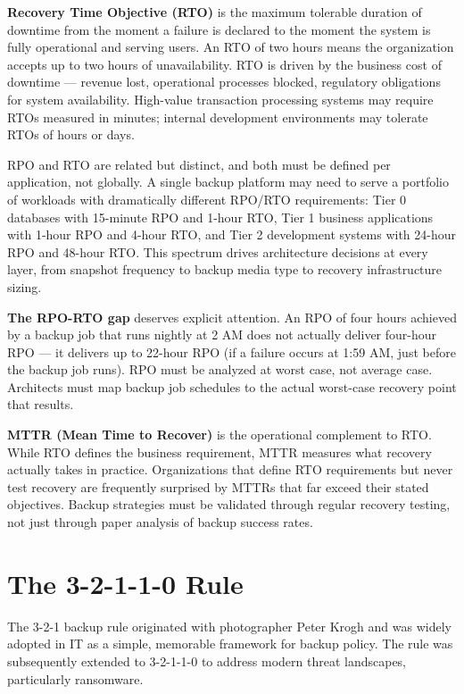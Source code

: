 \textbf{Recovery Time Objective (RTO)} is the maximum tolerable duration of downtime from the moment a failure is declared to the moment the system is fully operational and serving users. An RTO of two hours means the organization accepts up to two hours of unavailability. RTO is driven by the business cost of downtime --- revenue lost, operational processes blocked, regulatory obligations for system availability. High-value transaction processing systems may require RTOs measured in minutes; internal development environments may tolerate RTOs of hours or days.

RPO and RTO are related but distinct, and both must be defined per application, not globally. A single backup platform may need to serve a portfolio of workloads with dramatically different RPO/RTO requirements: Tier 0 databases with 15-minute RPO and 1-hour RTO, Tier 1 business applications with 1-hour RPO and 4-hour RTO, and Tier 2 development systems with 24-hour RPO and 48-hour RTO. This spectrum drives architecture decisions at every layer, from snapshot frequency to backup media type to recovery infrastructure sizing.

\textbf{The RPO-RTO gap} deserves explicit attention. An RPO of four hours achieved by a backup job that runs nightly at 2 AM does not actually deliver four-hour RPO --- it delivers up to 22-hour RPO (if a failure occurs at 1:59 AM, just before the backup job runs). RPO must be analyzed at worst case, not average case. Architects must map backup job schedules to the actual worst-case recovery point that results.

\textbf{MTTR (Mean Time to Recover)} is the operational complement to RTO. While RTO defines the business requirement, MTTR measures what recovery actually takes in practice. Organizations that define RTO requirements but never test recovery are frequently surprised by MTTRs that far exceed their stated objectives. Backup strategies must be validated through regular recovery testing, not just through paper analysis of backup success rates.

\section{The 3-2-1-1-0 Rule}
The 3-2-1 backup rule originated with photographer Peter Krogh and was widely adopted in IT as a simple, memorable framework for backup policy. The rule was subsequently extended to 3-2-1-1-0 to address modern threat landscapes, particularly ransomware.

